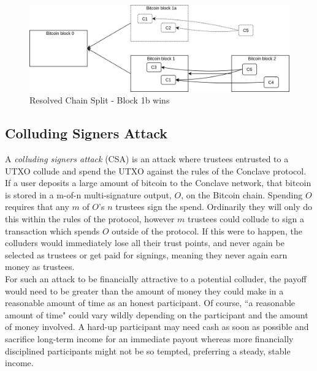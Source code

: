 \documentclass{report}
\begin{document}
			\begin{figure}[H]
				\begin{center}
					\includegraphics[width=350pt]{img/Chain-Split-3.png}
				\end{center}
				\caption{Resolved Chain Split - Block 1b wins}
				\label{fig:ucSplit3}
			\end{figure}
		
		
		\subsection{Colluding Signers Attack}
			A \textit{colluding signers attack} (CSA) is an attack where trustees entrusted to a UTXO collude and spend the UTXO against the rules of the Conclave protocol. \\
			 
			If a user deposits a large amount of bitcoin to the Conclave network, that bitcoin is stored in a m-of-n multi-signature  output, $O$, on the Bitcoin chain. Spending $O$ requires that any $m$ of $O$'s $n$ trustees sign the spend. Ordinarily they will only do this within the rules of the protocol, however $m$ trustees could collude to sign a transaction which spends $O$ outside of the protocol. If this were to happen, the colluders would immediately lose all their trust points,  and never again be selected as trustees or get paid for signings, meaning they never again earn money as trustees. \\
			
			For such an attack to be financially attractive to a potential colluder,  the payoff would need to be greater than the amount of money they could make in a reasonable amount of time as an honest participant. Of course, ``a reasonable amount of time" could vary wildly depending on the participant and the amount of money involved. A hard-up participant may need cash as soon as possible and sacrifice long-term income for an immediate payout whereas more financially disciplined participants might not be so tempted, preferring a steady, stable income. \\
			
\end{document}
